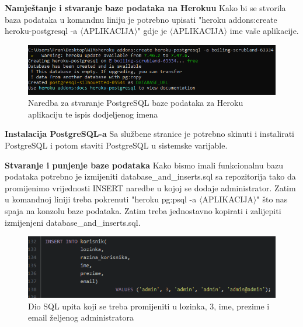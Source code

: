 			\vspace{5mm}
			\noindent \textbf{Namještanje i stvaranje baze podataka na Herokuu}\newline
			Kako bi se stvorila baza podataka u komandnu liniju je potrebno upisati "heroku addons:create heroku-postgresql -a $\langle$APLIKACIJA$\rangle$" gdje je $\langle$APLIKACIJA$\rangle$ ime vaše aplikacije.
			
			\begin{figure}[H]
				\includegraphics[scale=0.8]{slike/heroku_stvaranje_baze_podataka.PNG} 
				\centering
				\caption{Naredba za stvaranje PostgreSQL baze podataka za Heroku aplikaciju te ispis dodjeljenog imena}
				\label{fig:heroku_stvaranje_baze_podataka}%
			\end{figure}
			
			\vspace{5mm}
			 \noindent \textbf{Instalacija PostgreSQL-a}\newline
			 Sa službene stranice je potrebno skinuti i instalirati PostgreSQL i potom staviti PostgreSQL u sistemske varijable.
			 
			 \vspace{5mm}
			 \noindent \textbf{Stvaranje i punjenje baze podataka}\newline
			 Kako bismo imali funkcionalnu bazu podataka potrebno je izmijeniti database\_and\_inserts.sql sa repozitorija tako da promijenimo vrijednosti INSERT naredbe u kojoj se dodaje administrator. Zatim u komandnoj liniji treba pokrenuti "heroku pg:psql -a $\langle$APLIKACIJA$\rangle$" što nas spaja na konzolu baze podataka. Zatim treba jednostavno kopirati i zalijepiti izmijenjeni database\_and\_inserts.sql.
			 
			 \begin{figure}[H]
			 	\includegraphics[scale=0.8]{slike/sql_admin.PNG} 
			 	\centering
			 	\caption{Dio SQL upita koji se treba promijeniti u lozinka, 3, ime, prezime i email željenog administratora}
			 	\label{fig:sql_admin}%
			 \end{figure}
		 
